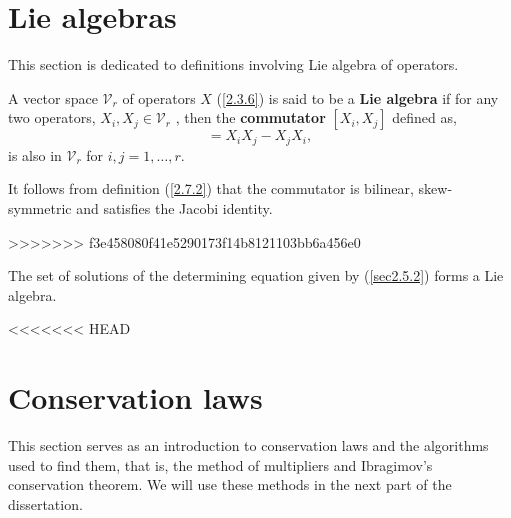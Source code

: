 \section{Lie algebras}
This section is dedicated to definitions involving Lie algebra of operators. 
\begin{defn} A vector space $ \mathcal{V}_{r}$ of operators \citep{ibragimov1999elementary}  $X$ (\ref{2.3.6}) is said to be a \textbf{Lie algebra} if for any two operators, $X_i, X_j \in  \mathcal{V}_r$ , then the \textbf{commutator} $[X_i,X_j ]$ defined as, \begin{equation} [X_i,X_j ]= X_iX_j-X_jX_i, \label{2.7.2}\end{equation} is also in $ \mathcal{V}_r$  for $ i,j=1,\ldots,r$.
\end{defn}
\begin{rem}
It follows  from definition (\ref{2.7.2}) that the commutator is bilinear, skew-symmetric and satisfies the Jacobi identity.	
\end{rem}

>>>>>>> f3e458080f41e5290173f14b8121103bb6a456e0
\begin{thm}
The set of  solutions of the  determining equation given by  (\ref{sec2.5.2}) forms a Lie algebra\citep{ibragimov}. 
\end{thm}
<<<<<<< HEAD
\section{Conservation laws}
This section serves as an introduction to conservation laws and the algorithms used to find them, that is, the method of multipliers and Ibragimov's conservation theorem. We will use these methods in the next part of the dissertation.
